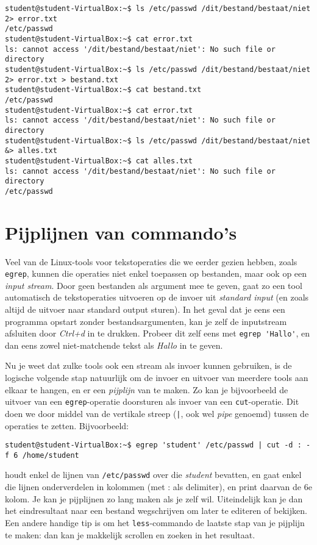 \documentclass[a4paper,twoside,openany]{memoir}
\begin{document}
\begin{verbatim}
student@student-VirtualBox:~$ ls /etc/passwd /dit/bestand/bestaat/niet 2> error.txt
/etc/passwd
student@student-VirtualBox:~$ cat error.txt
ls: cannot access '/dit/bestand/bestaat/niet': No such file or directory
student@student-VirtualBox:~$ ls /etc/passwd /dit/bestand/bestaat/niet 2> error.txt > bestand.txt
student@student-VirtualBox:~$ cat bestand.txt
/etc/passwd
student@student-VirtualBox:~$ cat error.txt
ls: cannot access '/dit/bestand/bestaat/niet': No such file or directory
student@student-VirtualBox:~$ ls /etc/passwd /dit/bestand/bestaat/niet &> alles.txt
student@student-VirtualBox:~$ cat alles.txt
ls: cannot access '/dit/bestand/bestaat/niet': No such file or directory
/etc/passwd
\end{verbatim}

\chapter{Pijplijnen van commando's}

Veel van de Linux-tools voor tekstoperaties die we eerder gezien hebben, zoals
\verb!egrep!, kunnen die operaties niet enkel toepassen op bestanden, maar ook
op een \emph{input stream}. Door geen bestanden als argument mee te geven, gaat
zo een tool automatisch de tekstoperaties uitvoeren op de invoer uit
\emph{standard input} (en zoals altijd de uitvoer naar standard output sturen).
In het geval dat je eens een programma opstart zonder bestandsargumenten, kan je
zelf de inputstream afsluiten door \emph{Ctrl+d} in te drukken. Probeer dit zelf
eens met \verb!egrep 'Hallo'!, en dan eens zowel niet-matchende tekst als
\emph{Hallo} in te geven.

Nu je weet dat zulke tools ook een stream als invoer kunnen gebruiken, is de
logische volgende stap natuurlijk om de invoer en uitvoer van meerdere tools aan
elkaar te hangen, en er een \emph{pijplijn} van te maken. Zo kan je bijvoorbeeld
de uitvoer van een \verb!egrep!-operatie doorsturen als invoer van een
\verb!cut!-operatie. Dit doen we door middel van de vertikale streep (\verb!|!,
ook wel \emph{pipe} genoemd) tussen de operaties te zetten. Bijvoorbeeld:
\begin{verbatim}
student@student-VirtualBox:~$ egrep 'student' /etc/passwd | cut -d : -f 6 /home/student
\end{verbatim}

houdt enkel de lijnen van \verb!/etc/passwd! over die \emph{student} bevatten,
en gaat enkel die lijnen onderverdelen in kolommen (met : als delimiter), en
print daarvan de 6e kolom. Je kan je pijplijnen zo lang maken als je zelf wil.
Uiteindelijk kan je dan het eindresultaat naar een bestand wegschrijven om later
te editeren of bekijken. Een andere handige tip is om het \verb!less!-commando
de laatste stap van je pijplijn te maken: dan kan je makkelijk scrollen en
zoeken in het resultaat.
\end{document}
